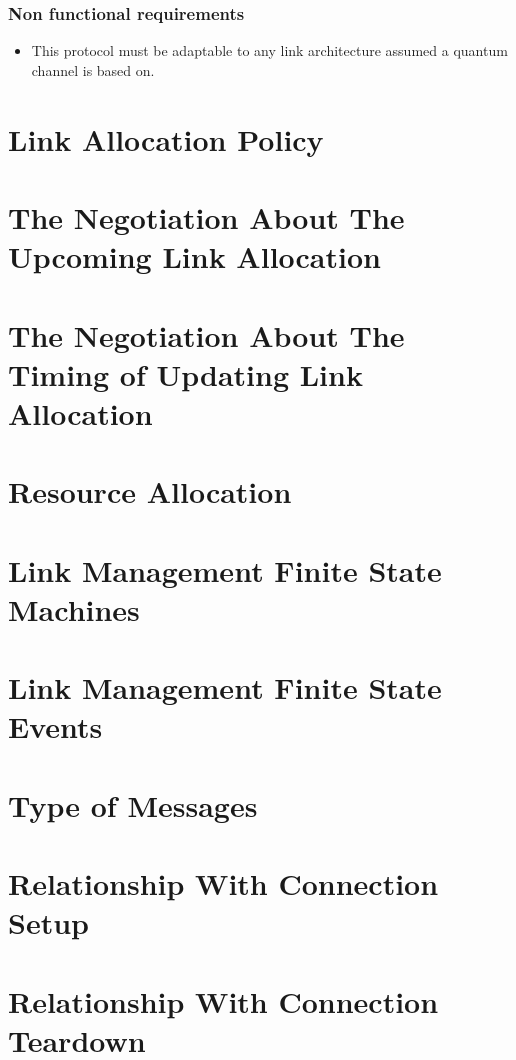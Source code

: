 \subsubsection{Non functional requirements}

\begin{itemize}
  \item This protocol must be adaptable to any link architecture assumed a quantum channel is based on.
\end{itemize}

\section{Link Allocation Policy}
\section{The Negotiation About The Upcoming Link Allocation}
\section{The Negotiation About The Timing of Updating Link Allocation}
\section{Resource Allocation }
\section{Link Management Finite State Machines}
\section{Link Management Finite State Events}
\section{Type of Messages}
\section{Relationship With Connection Setup}
\section{Relationship With Connection Teardown}

